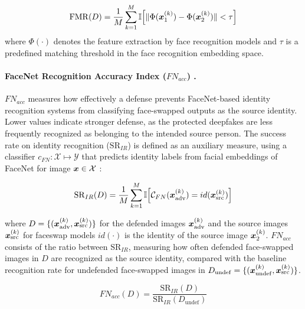 \documentclass{article}
\begin{document}
\begin{equation}
\mathrm{FMR}(D) = \frac{1}{M} \sum_{k=1}^{M} \mathbb{I} \Big[ \| \Phi({\bm{x}}_1^{(k)}) - \Phi({\bm{x}}_2^{(k)}) \| < \tau \Big]
\label{eq:fmr}
\end{equation}
\noindent where $\Phi(\cdot)$ denotes the feature extraction by face recognition models and $\tau$ is a predefined matching threshold in the face recognition embedding space.

\paragraph{FaceNet Recognition Accuracy Index ($FN_{acc}$)  .}
$FN_{acc}$ measures how effectively a defense prevents FaceNet-based identity recognition systems from classifying face-swapped outputs as the source identity. Lower values indicate stronger defense, as the protected deepfakes are less frequently recognized as belonging to the intended source person. The success rate on identity recognition ($\mathrm{SR}_{IR}$) is defined as an auxiliary measure, using a classifier $c_{FN}: \mathcal{X}\mapsto \mathcal{Y}$ that predicts identity labels from facial embeddings of FaceNet for image ${\bm{x}} \in \mathcal{X}$ \cite{schroff2015facenet}:

\begin{equation}
\mathrm{SR}_{IR}(D) = \frac{1}{M} \sum_{k=1}^{M} \mathbb{I} \Big[ \mathcal{C}_{FN}( {\bm{x}}^{(k)}_{\mathrm{adv}})=id({\bm{x}}_{\mathrm{src}}^{(k)})\Big]
\label{eq:facenetrate}
\end{equation}

\noindent where $D = \{({\bm{x}}_{\mathrm{adv}}^{(k)}, {\bm{x}}_{\mathrm{src}}^{(k)})\}$ for the defended images ${\bm{x}}_{\mathrm{adv}}^{(k)}$ and the source images ${\bm{x}}_{\mathrm{src}}^{(k)}$ for faceswap models $id(\cdot)$ is the identity of the source image ${\bm{x}}_2^{(k)}$. $FN_{acc}$ consists of the ratio between $\mathrm{SR}_{IR}$, measuring how often defended face-swapped images in $D$ are recognized as the source identity, compared with the baseline recognition rate for undefended face-swapped images in $D_{\mathrm{undef}} = \{({\bm{x}}_{\mathrm{undef}}^{(k)}, {\bm{x}}_{\mathrm{src}}^{(k)})\}$.

\begin{equation}
FN_{acc}(D) = \frac{\mathrm{SR}_{IR}(D)}{\mathrm{SR}_{IR}(D_{\mathrm{undef}})}
\label{eq:fn_acc}
\end{equation}

\end{document}
